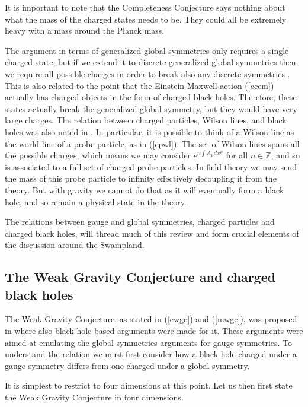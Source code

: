 \documentclass[11pt,a4paper]{article}
\numberwithin{equation}{section}
\numberwithin{table}{section}\setlength{\multlinegap}{25pt}
\begin{document}
It is important to note that the Completeness Conjecture says nothing about what the mass of the charged states needs to be. They could all be extremely heavy with a mass around the Planck mass. 

The argument in terms of generalized global symmetries only requires a single charged state, but if we extend it to discrete generalized global symmetries then we require all possible charges in order to break also any discrete symmetries \cite{Gaiotto:2014kfa}.  This is also related to the point that the Einstein-Maxwell action (\ref{ccem}) actually has charged objects in the form of charged black holes.  Therefore, these states actually break the generalized global symmetry, but they would have very large charges. The relation between charged particles, Wilson lines, and black holes was also noted in \cite{Banks:2010zn}. In particular, it is possible to think of a Wilson line as the world-line of a probe particle, as in (\ref{cpwl}). The set of Wilson lines spans all the possible charges, which means we may consider $e^{n\int A_{\mu} dx^{\mu}}$  for all $n \in \mathbb{Z}$, and so is associated to a full set of charged probe particles. In field theory we may send the mass of this probe particle to infinity effectively decoupling it from the theory. But with gravity we cannot do that as it will eventually form a black hole, and so remain a physical state in the theory. 

The relations between gauge and global symmetries, charged particles and charged black holes, will thread much of this review and form crucial elements of the discussion around the Swampland. 

\subsection{The Weak Gravity Conjecture and charged black holes}
\label{sec:wgccbhs}

The Weak Gravity Conjecture, as stated in (\ref{ewgc}) and (\ref{mwgc}), was proposed in \cite{ArkaniHamed:2006dz} where also black hole based arguments were made for it. These arguments were aimed at emulating the global symmetries arguments for gauge symmetries. To understand the relation we must first consider how a black hole charged under a gauge symmetry differs from one charged under a global symmetry. 

It is simplest to restrict to four dimensions at this point. Let us then first state the Weak Gravity Conjecture in four dimensions.
\end{document}
